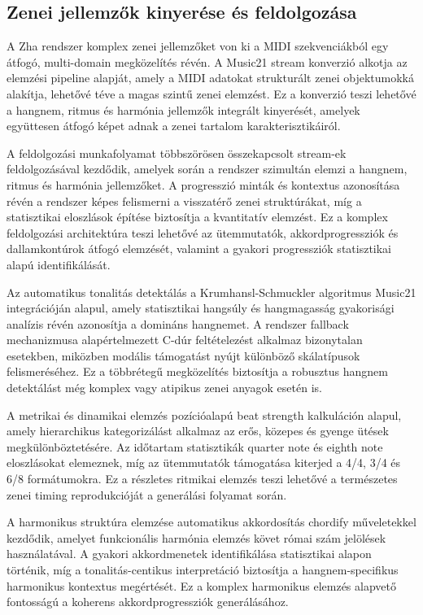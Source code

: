 \subsection{Zenei jellemzők kinyerése és feldolgozása}

A Zha rendszer komplex zenei jellemzőket von ki a MIDI szekvenciákból egy átfogó, multi-domain megközelítés révén. A Music21 stream konverzió alkotja az elemzési pipeline alapját, amely a MIDI adatokat strukturált zenei objektumokká alakítja, lehetővé téve a magas szintű zenei elemzést. Ez a konverzió teszi lehetővé a hangnem, ritmus és harmónia jellemzők integrált kinyerését, amelyek együttesen átfogó képet adnak a zenei tartalom karakterisztikáiról.

A feldolgozási munkafolyamat többszörösen összekapcsolt stream-ek feldolgozásával kezdődik, amelyek során a rendszer szimultán elemzi a hangnem, ritmus és harmónia jellemzőket. A progresszió minták és kontextus azonosítása révén a rendszer képes felismerni a visszatérő zenei struktúrákat, míg a statisztikai eloszlások építése biztosítja a kvantitatív elemzést. Ez a komplex feldolgozási architektúra teszi lehetővé az ütemmutatók, akkordprogressziók és dallamkontúrok átfogó elemzését, valamint a gyakori progressziók statisztikai alapú identifikálását.

Az automatikus tonalitás detektálás a Krumhansl-Schmuckler algoritmus Music21 integrációján alapul, amely statisztikai hangsúly és hangmagasság gyakorisági analízis révén azonosítja a domináns hangnemet. A rendszer fallback mechanizmusa alapértelmezett C-dúr feltételezést alkalmaz bizonytalan esetekben, miközben modális támogatást nyújt különböző skálatípusok felismeréséhez. Ez a többrétegű megközelítés biztosítja a robusztus hangnem detektálást még komplex vagy atipikus zenei anyagok esetén is.

A metrikai és dinamikai elemzés pozícióalapú beat strength kalkuláción alapul, amely hierarchikus kategorizálást alkalmaz az erős, közepes és gyenge ütések megkülönböztetésére. Az időtartam statisztikák quarter note és eighth note eloszlásokat elemeznek, míg az ütemmutatók támogatása kiterjed a 4/4, 3/4 és 6/8 formátumokra. Ez a részletes ritmikai elemzés teszi lehetővé a természetes zenei timing reprodukcióját a generálási folyamat során.

A harmonikus struktúra elemzése automatikus akkordosítás chordify műveletekkel kezdődik, amelyet funkcionális harmónia elemzés követ római szám jelölések használatával. A gyakori akkordmenetek identifikálása statisztikai alapon történik, míg a tonalitás-centikus interpretáció biztosítja a hangnem-specifikus harmonikus kontextus megértését. Ez a komplex harmonikus elemzés alapvető fontosságú a koherens akkordprogressziók generálásához.

